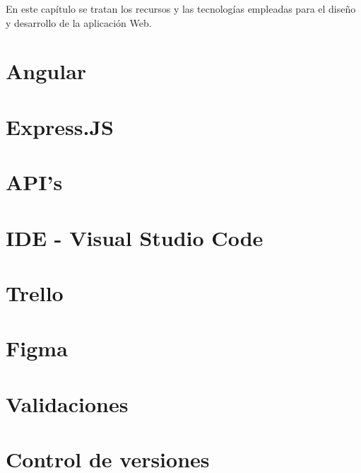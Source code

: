 \label{recursos}
En este capítulo se tratan los recursos y las tecnologías empleadas para el
diseño y desarrollo de la aplicación Web.

\section{Angular}\label{Angular}


\section{Express.JS}\label{ExpressJS}


\section{API's}\label{APIs}


\section{IDE - Visual Studio Code}\label{VSCode}


\section{Trello}\label{Trello}


\section{Figma}\label{Figma}

\section{Validaciones}\label{validaciones}

\section{Control de versiones}\label{git}
